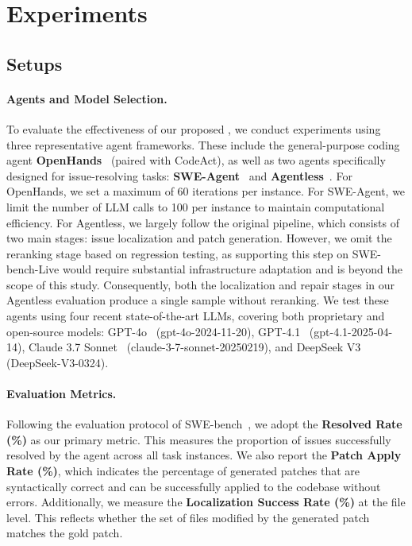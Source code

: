 \section{Experiments}
\label{sec:experiments}
\subsection{Setups}

\paragraph{Agents and Model Selection.} 
To evaluate the effectiveness of our proposed \benchmark, we conduct experiments using three representative agent frameworks. These include the general-purpose coding agent \textbf{OpenHands}~\cite{openhands} (paired with CodeAct), as well as two agents specifically designed for issue-resolving tasks: \textbf{SWE-Agent}~\cite{sweagent} and \textbf{Agentless}~\cite{xia2024agentless}. For OpenHands, we set a maximum of 60 iterations per instance. For SWE-Agent, we limit the number of LLM calls to 100 per instance to maintain computational efficiency. For Agentless, we largely follow the original pipeline, which consists of two main stages: issue localization and patch generation. However, we omit the reranking stage based on regression testing, as supporting this step on SWE-bench-Live would require substantial infrastructure adaptation and is beyond the scope of this study. Consequently, both the localization and repair stages in our Agentless evaluation produce a single sample without reranking. We test these agents using four recent state-of-the-art LLMs, covering both proprietary and open-source models: GPT-4o~\cite{openai_gpt4o} (gpt-4o-2024-11-20), GPT-4.1~\cite{openai_gpt41} (gpt-4.1-2025-04-14), Claude 3.7 Sonnet~\cite{claude_37} (claude-3-7-sonnet-20250219), and DeepSeek V3~\cite{deepseek_v3} (DeepSeek-V3-0324).

\paragraph{Evaluation Metrics.} 
Following the evaluation protocol of SWE-bench~\cite{swebench}, we adopt the \textbf{Resolved Rate (\%)} as our primary metric. This measures the proportion of issues successfully resolved by the agent across all task instances. We also report the \textbf{Patch Apply Rate (\%)}, which indicates the percentage of generated patches that are syntactically correct and can be successfully applied to the codebase without errors. Additionally, we measure the \textbf{Localization Success Rate (\%)} at the file level. This reflects whether the set of files modified by the generated patch matches the gold patch.


